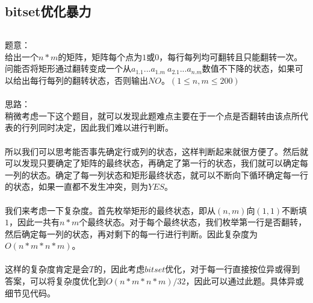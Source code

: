 \documentclass[twoside]{article}
\begin{document}
\subsection{bitset优化暴力}
\begin{lstlisting}
\end{lstlisting}
题意：\\
给出一个$n*m$的矩阵，矩阵每个点为$1$或$0$，每行每列均可翻转且只能翻转一次。问能否将矩形通过翻转变成一个从$a_{1.1}...a_{1.m}\ a_{2.1}...a_{n.m}$数值不下降的状态，如果可以给出每行每列的翻转状态，否则输出$NO$。$(1\leq n,m\leq 200)$\\
\\
思路：\\
稍微考虑一下这个题目，就可以发现此题难点主要在于一个点是否翻转由该点所代表的行列同时决定，因此我们难以进行判断。\\
\\
所以我们可以思考能否事先确定行或列的状态，这样判断起来就很方便了。然后就可以发现只要确定了矩阵的最终状态，再确定了第一行的状态，我们就可以确定每一列的状态。确定了每一列状态和矩形最终状态，就可以不断向下循环确定每一行的状态，如果一直都不发生冲突，则为$YES$。\\
\\
我们来考虑一下复杂度。首先枚举矩形的最终状态，即从$(n,m)$向$(1,1)$不断填$1$，因此一共有$n*m$个最终状态。对于每个最终状态，我们枚举第一行是否翻转，然后确定每一列的状态，再对剩下的每一行进行判断。因此复杂度为$O(n*m*n*m)$。\\
\\
这样的复杂度肯定是会$T$的，因此考虑$bitset$优化，对于每一行直接按位异或得到答案，可以将复杂度优化到$O(n*m*n*m)/32$，因此可以通过此题。具体异或细节见代码。\\
\\
\end{document}
